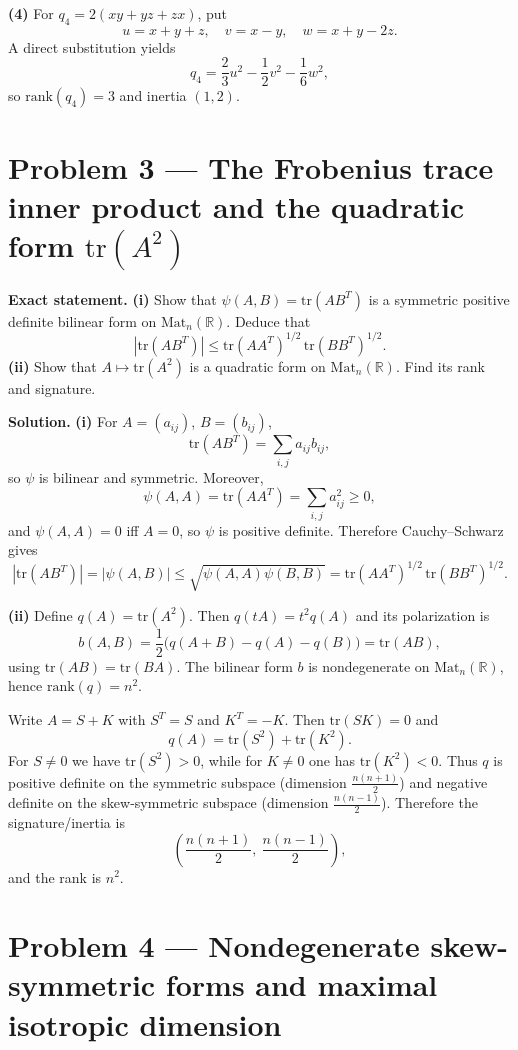 \documentclass[12pt,a4paper]{article}
\theoremstyle{plain}
\theoremstyle{definition}      %
\begin{document}
\textbf{(4) } For $q_4=2(xy+yz+zx)$, put
\[
u=x+y+z,\quad v=x-y,\quad w=x+y-2z.
\]
A direct substitution yields
\[
q_4=\frac{2}{3}u^2-\frac{1}{2}v^2-\frac{1}{6}w^2,
\]
so $\mathrm{rank}(q_4)=3$ and inertia $(1,2)$.


\section{Problem 3 — The Frobenius trace inner product and the quadratic form $\mathrm{tr}(A^2)$}

\textbf{Exact statement.}
\textbf{(i)} Show that $\psi(A,B)=\mathrm{tr}(AB^T)$ is a symmetric positive definite bilinear form on $\mathrm{Mat}_n(\mathbb R)$.
Deduce that
\[
|\mathrm{tr}(AB^T)|\le \mathrm{tr}(AA^T)^{1/2}\,\mathrm{tr}(BB^T)^{1/2}.
\]
\textbf{(ii)} Show that $A\mapsto \mathrm{tr}(A^2)$ is a quadratic form on $\mathrm{Mat}_n(\mathbb R)$. Find its rank and signature.

\textbf{Solution.}
\textbf{(i)} For $A=(a_{ij})$, $B=(b_{ij})$,
\[
\mathrm{tr}(AB^T)=\sum_{i,j}a_{ij}b_{ij},
\]
so $\psi$ is bilinear and symmetric. Moreover,
\[
\psi(A,A)=\mathrm{tr}(AA^T)=\sum_{i,j}a_{ij}^2\ge 0,
\]
and $\psi(A,A)=0$ iff $A=0$, so $\psi$ is positive definite. Therefore Cauchy--Schwarz gives
\[
|\mathrm{tr}(AB^T)|=|\psi(A,B)|\le \sqrt{\psi(A,A)\psi(B,B)}
=\mathrm{tr}(AA^T)^{1/2}\,\mathrm{tr}(BB^T)^{1/2}.
\]

\textbf{(ii)} Define $q(A)=\mathrm{tr}(A^2)$. Then $q(tA)=t^2q(A)$ and its polarization is
\[
b(A,B)=\frac12\bigl(q(A+B)-q(A)-q(B)\bigr)=\mathrm{tr}(AB),
\]
using $\mathrm{tr}(AB)=\mathrm{tr}(BA)$. The bilinear form $b$ is nondegenerate on $\mathrm{Mat}_n(\mathbb R)$, hence $\mathrm{rank}(q)=n^2$.

Write $A=S+K$ with $S^T=S$ and $K^T=-K$. Then $\mathrm{tr}(SK)=0$ and
\[
q(A)=\mathrm{tr}(S^2)+\mathrm{tr}(K^2).
\]
For $S\neq 0$ we have $\mathrm{tr}(S^2)>0$, while for $K\neq 0$ one has $\mathrm{tr}(K^2)<0$.
Thus $q$ is positive definite on the symmetric subspace (dimension $\frac{n(n+1)}2$) and negative definite on the skew-symmetric subspace (dimension $\frac{n(n-1)}2$).
Therefore the signature/inertia is
\[
\left(\frac{n(n+1)}2,\ \frac{n(n-1)}2\right),
\]
and the rank is $n^2$.


\section{Problem 4 — Nondegenerate skew-symmetric forms and maximal isotropic dimension}
\end{document}
